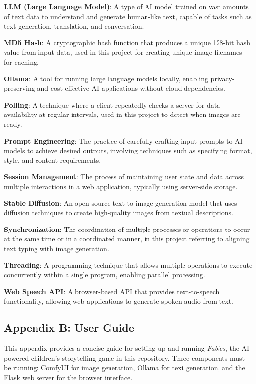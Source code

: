 \documentclass[12pt,a4paper]{article}
\begin{document}
    \textbf{LLM (Large Language Model)}: A type of AI model trained on vast amounts of text data to understand and generate human-like text, capable of tasks such as text generation, translation, and conversation.

    \textbf{MD5 Hash}: A cryptographic hash function that produces a unique 128-bit hash value from input data, used in this project for creating unique image filenames for caching.

    \textbf{Ollama}: A tool for running large language models locally, enabling privacy-preserving and cost-effective AI applications without cloud dependencies.

    \textbf{Polling}: A technique where a client repeatedly checks a server for data availability at regular intervals, used in this project to detect when images are ready.

    \textbf{Prompt Engineering}: The practice of carefully crafting input prompts to AI models to achieve desired outputs, involving techniques such as specifying format, style, and content requirements.

    \textbf{Session Management}: The process of maintaining user state and data across multiple interactions in a web application, typically using server-side storage.

    \textbf{Stable Diffusion}: An open-source text-to-image generation model that uses diffusion techniques to create high-quality images from textual descriptions.

    \textbf{Synchronization}: The coordination of multiple processes or operations to occur at the same time or in a coordinated manner, in this project referring to aligning text typing with image generation.

    \textbf{Threading}: A programming technique that allows multiple operations to execute concurrently within a single program, enabling parallel processing.

    \textbf{Web Speech API}: A browser-based API that provides text-to-speech functionality, allowing web applications to generate spoken audio from text.

    \subsection*{Appendix B: User Guide}

This appendix provides a concise guide for setting up and running \textit{Fables}, the AI-powered children's storytelling game in this repository. Three components must be running: ComfyUI for image generation, Ollama for text generation, and the Flask web server for the browser interface.
\end{document}
